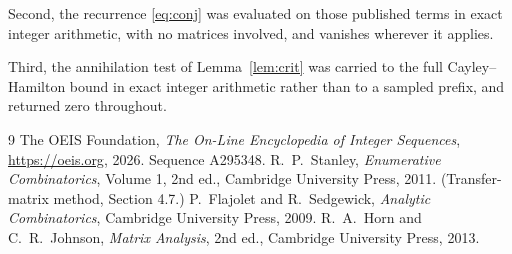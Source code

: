\documentclass[11pt,a4paper]{article}
\theoremstyle{plain}
\theoremstyle{definition}
\begin{document}
Second, the recurrence \eqref{eq:conj} was evaluated on those published terms in exact
integer arithmetic, with no matrices involved, and vanishes wherever it applies.

Third, the annihilation test of Lemma~\ref{lem:crit} was carried to the full
Cayley--Hamilton bound in exact integer arithmetic rather than to a sampled prefix, and
returned zero throughout.

\begin{thebibliography}{9}
 The OEIS Foundation, \emph{The On-Line Encyclopedia of Integer
Sequences}, \url{https://oeis.org}, 2026. Sequence A295348.
 R.~P.~Stanley, \emph{Enumerative Combinatorics}, Volume 1, 2nd ed.,
Cambridge University Press, 2011. (Transfer-matrix method, Section 4.7.)
 P.~Flajolet and R.~Sedgewick, \emph{Analytic Combinatorics}, Cambridge
University Press, 2009.
 R.~A.~Horn and C.~R.~Johnson, \emph{Matrix Analysis}, 2nd ed., Cambridge
University Press, 2013.
\end{thebibliography}
\end{document}
